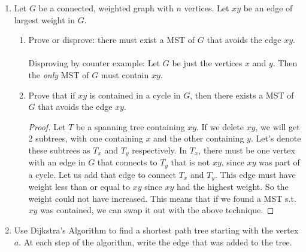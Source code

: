 \documentclass[12pt]{article}
\begin{document}
\begin{enumerate}
\medskip 

\item Let $G$ be a connected, weighted graph with $n$ vertices. Let $xy$ be an edge of largest weight in $G$.
\begin{enumerate}
\item Prove or disprove: there must exist a MST of $G$ that avoids the edge $xy$.\\\\
Disproving by counter example: Let $G$ be just the vertices $x$ and $y$. Then the \emph{only} MST of $G$ must contain $xy$.\\ 

\item Prove that if $xy$ is contained in a cycle in $G$, then there exists a MST of $G$ that avoids the edge $xy$.
\begin{proof}
	Let $T$ be a spanning tree containing $xy$. If we delete $xy$, we will get 2 subtrees, with one containing $x$ and the other containing $y$. Let's denote these subtrees as $T_x$ and $T_y$ respectively. In $T_x$, there must be one vertex with an edge in $G$ that connects to $T_y$ that is not $xy$, since $xy$ was part of a cycle. Let us add that edge to connect $T_x$ and $T_y$. This edge must have weight less than or equal to $xy$ since $xy$ had the highest weight. So the weight could not have increased. This means that if we found a MST s.t. $xy$ was contained, we can swap it out with the above technique.
\end{proof}

\end{enumerate}
\medskip

\item Use Dijkstra's Algorithm to find a shortest path tree starting with the vertex $a$. At each step of the algorithm, write the edge that was added to the tree.


\end{enumerate}
\end{document}
